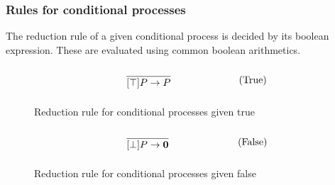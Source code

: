 


\FloatBarrier

\subsubsection{Rules for conditional processes}
The reduction rule of a given conditional process is decided by its boolean expression. These are evaluated using common boolean arithmetics.

\begin{figure}[h]
	\begin{align}
	& \infrule{}{[\top]P\ra P} \tag{True}
	\end{align}
	\caption{Reduction rule for conditional processes given true}
	\label{fig:true}
\end{figure}

\begin{figure}[h]
	\begin{align}
	& \infrule{}{[\bot]P\ra \nil} \tag{False}
	\end{align}
	\caption{Reduction rule for conditional processes given false}
	\label{fig:false}
\end{figure}

\FloatBarrier


